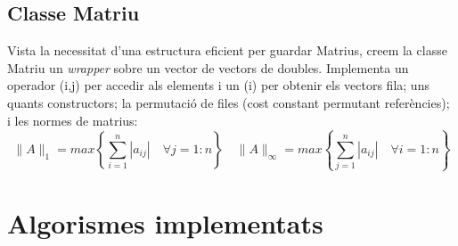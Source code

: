 \documentclass[a4paper,10pt]{article}
\begin{document}
\subsection{Classe Matriu}
Vista la necessitat d'una estructura eficient per guardar Matrius, creem la classe Matriu un \textit{wrapper} sobre un vector de vectors de doubles.
Implementa un operador (i,j) per accedir als elements i un (i) per obtenir els vectors fila; uns quants constructors; la permutació de files (cost constant
permutant referències); i les normes de matrius:
\[
 \|A\|_1 = max\left\{ \sum_{i=1}^n|a_{ij}| \quad \forall j = 1:n \right\} \quad
 \|A\|_\infty = max\left\{ \sum_{j=1}^n|a_{ij}| \quad \forall i = 1:n \right\}
\]
\section{Algorismes implementats}
\end{document}
